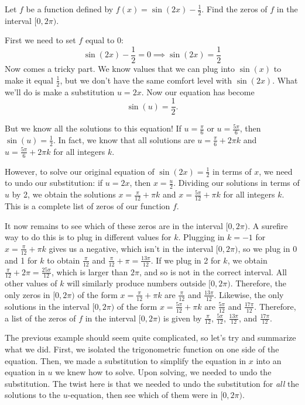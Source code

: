\documentclass{ximera}
\begin{document}
\begin{example}
Let $f$ be a function defined by $f(x)=\sin(2x) - \frac{1}{2}$. Find the zeros of $f$ in the interval $[0, 2\pi)$.

\begin{explanation}
First we need to set $f$ equal to $0$:
$$\sin(2x) - \frac{1}{2} = 0 \implies \sin(2x) = \frac{1}{2}$$
Now comes a tricky part. We know values that we can plug into $\sin(x)$ to make it equal $\frac{1}{2}$, but we don't have the same comfort level with $\sin(2x)$. What we'll do is make a substitution $u = 2x$. Now our equation has become
$$\sin(u) = \frac{1}{2}.$$

But we know all the solutions to this equation! If $u = \frac{\pi}{6}$ or $u = \frac{5\pi}{6}$, then $\sin(u) = \frac{1}{2}$. In fact, we know that all solutions are $u = \frac{\pi}{6} + 2\pi k$ and $u = \frac{5\pi}{6} + 2\pi k$ for all integers $k$.

However, to solve our original equation of $\sin(2x) = \frac{1}{2}$ in terms of $x$, we need to undo our substitution: if $u = 2x$, then $x = \frac{u}{2}$. Dividing our solutions in terms of $u$ by 2, we obtain the solutions $x = \frac{\pi}{12} + \pi k$ and $x = \frac{5\pi}{12} + \pi k$ for all integers $k$. This is a complete list of zeros of our function $f$.   

It now remains to see which of these zeros are in the interval $[0, 2\pi)$. A surefire way to do this is to plug in different values for $k$. Plugging in $k = -1$ for $x = \frac{\pi}{12} + \pi k$ gives us a negative, which isn't in the interval $[0, 2\pi)$, so we plug in 0 and 1 for $k$ to obtain $\frac{\pi}{12}$ and $\frac{\pi}{12} + \pi = \frac{13\pi}{12}$. If we plug in 2 for $k$, we obtain $\frac{\pi}{12} + 2\pi = \frac{25\pi}{12}$, which is larger than $2\pi$, and so is not in the correct interval. All other values of $k$ will similarly produce numbers outside $[0, 2\pi)$. Therefore, the only zeros in $[0, 2\pi)$ of the form $x = \frac{\pi}{12} + \pi k$ are $\frac{\pi}{12}$ and $\frac{13\pi}{12}$. Likewise, the only solutions in the interval $[0, 2\pi)$ of the form $x = \frac{5\pi}{12} + \pi k$ are $\frac{5\pi}{12}$ and $\frac{17\pi}{12}$. Therefore, a list of the zeros of $f$ in the interval $[0, 2\pi)$ is given by $\frac{\pi}{12}$, $\frac{5\pi}{12}$, $\frac{13\pi}{12}$, and $\frac{17\pi}{12}$. 
\end{explanation}
\end{example}

The previous example should seem quite complicated, so let's try and summarize what we did. First, we isolated the trigonometric function on one side of the equation. Then, we made a substitution to simplify the equation in $x$ into an equation in $u$ we knew how to solve. Upon solving, we needed to undo the substitution. The twist here is that we needed to undo the substitution for \emph{all} the solutions to the $u$-equation, then see which of them were in $[0, 2\pi)$. 
\end{document}
